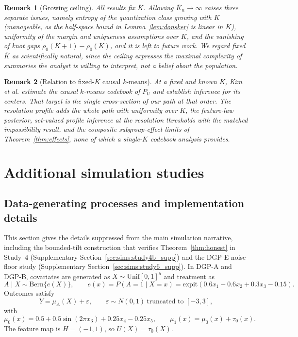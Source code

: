 \documentclass[11pt]{article}
\newtheorem{remark}{Remark}
\newcommand{\eps}{\varepsilon}
\begin{document}
\begin{remark}[Growing ceiling]\label{rem:growingK}
All results fix $\overline K$. Allowing $\overline K_n\to\infty$ raises three separate issues, namely entropy of the quantization class growing with $K$ (manageable, as the half-space bound in Lemma~\ref{lem:donsker} is linear in $K$), uniformity of the margin and uniqueness assumptions over $K$, and the vanishing of knot gaps $\rho_0(K+1)-\rho_0(K)$, and it is left to future work. We regard fixed $\overline K$ as scientifically natural, since the ceiling expresses the maximal complexity of summaries the analyst is willing to interpret, not a belief about the population.
\end{remark}

\begin{remark}[Relation to fixed-$K$ causal $k$-means]\label{rem:kkk}
At a fixed and known $K$, Kim et al. \cite{kim2026causal} estimate the causal $k$-means codebook of $P_U$ and establish inference for its centers. That target is the single cross-section of our path at that order. The resolution profile adds the whole path with uniformity over $K$, the feature-law posterior, set-valued profile inference at the resolution thresholds with the matched impossibility result, and the composite subgroup-effect limits of Theorem~\ref{thm:effects}, none of which a single-$K$ codebook analysis provides.
\end{remark}

\section{Additional simulation studies}\label{sec:app:additional_simulations}

\subsection{Data-generating processes and implementation details}\label{sec:sims:dgp_supp}

This section gives the details suppressed from the main simulation narrative, including the bounded-tilt construction that verifies Theorem~\ref{thm:honest} in Study~4 (Supplementary Section~\ref{sec:sims:study4b_supp}) and the DGP-E noise-floor study (Supplementary Section~\ref{sec:sims:study6_supp}).  In DGP-A and DGP-B, covariates are generated as $X\sim\mathrm{Unif}[0,1]^5$ and treatment as
\[
A\mid X\sim\mathrm{Bern}\{e(X)\},
\qquad
e(x)=P(A=1\mid X=x)=\mathrm{expit}(0.6x_1-0.6x_2+0.3x_3-0.15).
\]
Outcomes satisfy
\[
Y=\mu_A(X)+\eps,\qquad \eps\sim N(0,1)\ \text{truncated to }[-3,3],
\]
with
\[
\mu_0(x)=0.5+0.5\sin(2\pi x_3)+0.25x_4-0.25x_5,
\qquad
\mu_1(x)=\mu_0(x)+\tau_0(x).
\]
The feature map is $H=(-1,1)$, so $U(X)=\tau_0(X)$.
\end{document}
